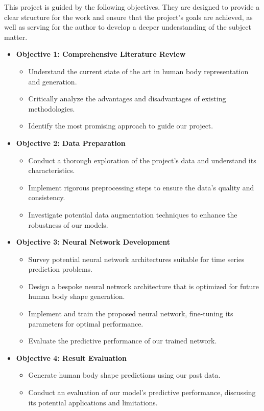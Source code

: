 This project is guided by the following objectives. They are designed to
provide a clear structure for the work and ensure that the project's goals are
achieved, as well as serving for the author to develop a deeper understanding
of the subject matter.

\begin{itemize}
	\item \textbf{Objective 1: Comprehensive Literature Review}
	      \begin{itemize}
		      \item Understand the current state of the art in human body representation and
		            generation.
		      \item Critically analyze the advantages and disadvantages of existing methodologies.
		      \item Identify the most promising approach to guide our project.
	      \end{itemize}

	\item \textbf{Objective 2: Data Preparation}
	      \begin{itemize}
		      \item Conduct a thorough exploration of the project's data and understand its
		            characteristics.
		      \item Implement rigorous preprocessing steps to ensure the data's quality and
		            consistency.
		      \item Investigate potential data augmentation techniques to enhance the robustness of
		            our models.
	      \end{itemize}

	\item \textbf{Objective 3: Neural Network Development}
	      \begin{itemize}
		      \item Survey potential neural network architectures suitable for time series
		            prediction problems.
		      \item Design a bespoke neural network architecture that is optimized for future human
		            body shape generation.
		      \item Implement and train the proposed neural network, fine-tuning its parameters for
		            optimal performance.
		      \item Evaluate the predictive performance of our trained network.
	      \end{itemize}

	\item \textbf{Objective 4: Result Evaluation}
	      \begin{itemize}
		      \item Generate human body shape predictions using our past data.
		      \item Conduct an evaluation of our model's predictive performance, discussing its
		            potential applications and limitations.
	      \end{itemize}

\end{itemize}
